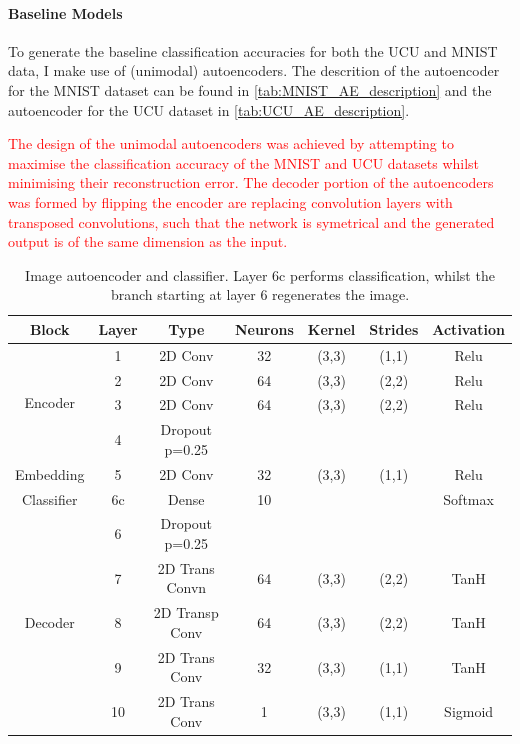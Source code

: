 \paragraph{Baseline Models}
To generate the baseline classification accuracies for both the UCU and MNIST data, I make use of (unimodal) autoencoders. The descrition of the autoencoder for the MNIST dataset can be found in \autoref{tab:MNIST_AE_description} and the autoencoder for the UCU dataset in \autoref{tab:UCU_AE_description}.

\textcolor{red}{The design of the unimodal autoencoders was achieved by attempting to maximise the classification accuracy of the MNIST and UCU datasets whilst minimising their reconstruction error. The decoder portion of the autoencoders was formed by flipping the encoder are replacing convolution layers with transposed convolutions, such that the network is symetrical and the generated output is of the same dimension as the input.}

	\begin{table}[th!]
		\centering
		\begin{tabular}{|c|c|c|c|c|c|c|}
			\hline
			\textbf{Block} & \textbf{Layer} & \textbf{Type} & \textbf{Neurons} & \textbf{Kernel} & \textbf{Strides} & \textbf{Activation}  \\ \hline
			\multirow{4}{*}{Encoder} & 1	&	2D Conv & 32 & (3,3) & (1,1)  & Relu\\ \cline{2-7}
			& 2	&	2D Conv & 64 & (3,3) & (2,2) & Relu \\ \cline{2-7}
			& 3	&	2D Conv & 64 & (3,3) & (2,2) & Relu \\ \cline{2-7}
			& 4 	&	Dropout p=0.25 &	 & 	     &       & \\ \hline
			Embedding & 5	&	2D Conv & 32 & (3,3) & (1,1) & Relu \\ \hline
			Classifier & 6c	&	Dense          & 10 &       &       & Softmax      \\ \hline
			\multirow{5}{*}{Decoder}& 6 	&	Dropout p=0.25 &	 & 	     &       & \\ \cline{2-7}
			& 7	&	2D Trans Convn & 64 & (3,3) & (2,2) & TanH \\ \cline{2-7}
			& 8	&	2D Transp Conv & 64 & (3,3) & (2,2) & TanH \\ \cline{2-7}
			& 9	&	2D Trans Conv & 32 & (3,3) & (1,1) & TanH \\ \cline{2-7}
			& 10	&	2D Trans Conv & 1 & (3,3) & (1,1) & Sigmoid \\ \hline
		\end{tabular}
		\caption{Image autoencoder and classifier. Layer 6c performs classification, whilst the branch starting at layer 6 regenerates the image.}
		\label{tab:MNIST_AE_description}
	\end{table}

